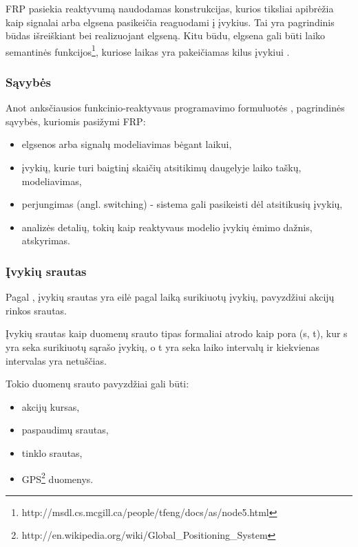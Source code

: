 FRP pasiekia reaktyvumą naudodamas konstrukcijas, kurios tiksliai apibrėžia kaip signalai arba elgsena pasikeičia reaguodami į įvykius. Tai yra pagrindinis būdas išreiškiant bei realizuojant elgseną. Kitu būdu, elgsena gali būti laiko semantinės funkcijos\footnote{http://msdl.cs.mcgill.ca/people/tfeng/docs/as/node5.html}, kuriose laikas yra pakeičiamas kilus įvykiui \cite{Nilsson:2002:FRP:581690.581695}.

\subsubsection{Sąvybės}

Anot anksčiausios funkcinio-reaktyvaus programavimo formuluotės \cite{ElliottHudak97:Fran}, pagrindinės sąvybės, kuriomis pasižymi FRP:

\begin{itemize}

	\item elgsenos arba signalų modeliavimas bėgant laikui,

	\item įvykių, kurie turi baigtinį skaičių atsitikimų daugelyje laiko taškų, modeliavimas,

	\item perjungimas (angl. switching) - sistema gali pasikeisti dėl atsitikusių įvykių,

	\item analizės detalių, tokių kaip reaktyvaus modelio įvykių ėmimo dažnis, atskyrimas.

\end{itemize}

\subsubsection{Įvykių srautas}

Pagal \cite{Bass:2007:Mythbusters}, įvykių srautas yra eilė pagal laiką surikiuotų įvykių, pavyzdžiui akcijų rinkos srautas.

Įvykių srautas kaip duomenų srauto tipas formaliai atrodo kaip pora (s, t), kur s yra seka surikiuotų sąrašo įvykių, o t yra seka laiko intervalų ir kiekvienas intervalas yra netuščias.

Tokio duomenų srauto pavyzdžiai gali būti:

\begin{itemize}

	\item akcijų kursas,

	\item paspaudimų srautas,

	\item tinklo srautas,

	\item GPS\footnote{http://en.wikipedia.org/wiki/Global\_Positioning\_System} duomenys.

\end{itemize}

